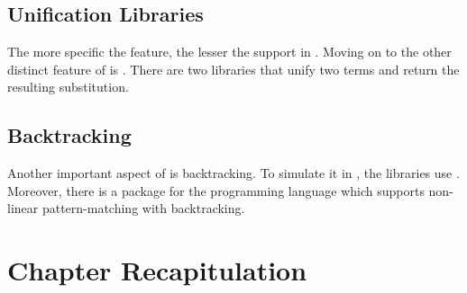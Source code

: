 \documentclass[thesis-solanki.tex]{subfiles}
\begin{document}
\subsection{Unification Libraries}

The more specific the feature, the lesser the support in .
Moving on to the other distinct feature of  is .
There are two libraries    that unify two  terms and return
the resulting substitution.


\subsection{Backtracking}

Another important aspect of  is backtracking.
To simulate it in , the libraries \cite{stream-monad-lib, logicst-lib} use .
Moreover, there is a package for the  programming language \cite{egison-lib} which supports
non-linear pattern-matching with backtracking.




\section{Chapter Recapitulation}


\ifMain
\begin{scope}
  \nolinenumbers
  \enotesize
  \par
  \begin{singlespace}
  \setlength{\parskip}{12pt plus 2pt minus 1pt}
  \theendnotes
  \par
  \end{singlespace}
\end{scope}
\fi
\end{document}
